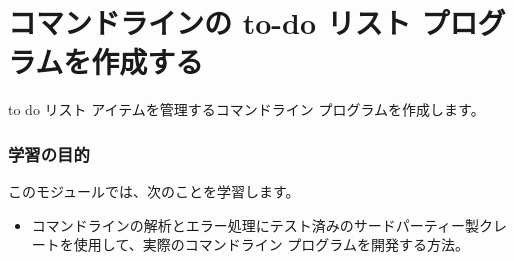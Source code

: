 \section{コマンドラインの to-do リスト プログラムを作成する}

to do リスト アイテムを管理するコマンドライン プログラムを作成します。

\subsubsection{学習の目的}

このモジュールでは、次のことを学習します。

\begin{itemize}
\item コマンドラインの解析とエラー処理にテスト済みのサードパーティー製クレートを使用して、実際のコマンドライン プログラムを開発する方法。
\end{itemize}

